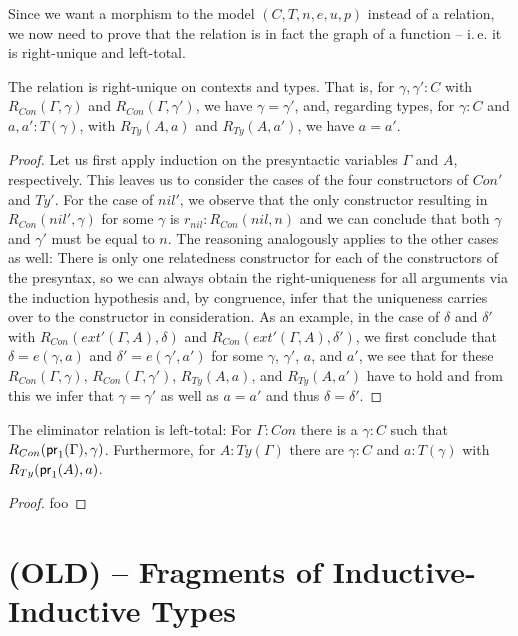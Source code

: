 Since we want a morphism to the model $(C, T, n, e, u, p)$ instead of a relation,
we now need to prove that the relation is in fact the graph of a function --
i.\,e. it is right-unique and left-total.

\begin{lemma}
The relation is right-unique on contexts and types. That is, for
$\gamma, \gamma' : C$ with $R_{Con}(\Gamma, \gamma)$ and $R_{Con}(\Gamma, \gamma')$,
we have $\gamma = \gamma'$, and, regarding types, for $\gamma : C$ and
$a, a' : T(\gamma)$, with $R_{Ty}(A, a)$ and $R_{Ty}(A, a')$,
we have $a = a'$.
\end{lemma}

\begin{proof}
Let us first apply induction on the presyntactic variables $\Gamma$ and $A$,
respectively.
This leaves us to consider the cases of the four constructors of $Con'$ and $Ty'$.
For the case of $nil'$, we observe that the only constructor resulting in
$R_{Con}(nil', \gamma)$ for some $\gamma$ is $r_{nil} : R_{Con}(nil, n)$ and we
can conclude that both $\gamma$ and $\gamma'$ must be equal to $n$.
The reasoning analogously applies to the other cases as well:
There is only one relatedness constructor for each of the constructors of the
presyntax, so we can always obtain the right-uniqueness for all arguments via
the induction hypothesis and, by congruence, infer that the uniqueness carries
over to the constructor in consideration.
As an example, in the case of $\delta$ and $\delta'$ with $R_{Con}(ext'(\Gamma, A), \delta)$
and $R_{Con}(ext'(\Gamma, A), \delta')$, we first conclude that
$\delta = e(\gamma, a)$ and $\delta' = e(\gamma', a')$ for some $\gamma$, $\gamma'$,
$a$, and $a'$, we see that for these $R_{Con}(\Gamma, \gamma)$, $R_{Con}(\Gamma, \gamma')$,
$R_{Ty}(A, a)$, and $R_{Ty}(A, a')$ have to hold and from this we infer
that $\gamma = \gamma'$ as well as $a = a'$ and thus $\delta = \delta'$.
\end{proof}

\begin{lemma}
The eliminator relation is left-total: For $\Gamma : Con$ there is a $\gamma : C$
such that $R_{Con}(\mathsf{pr}_1(\Gamma), \gamma)$.
Furthermore, for $A : Ty(\Gamma)$ there are $\gamma : C$ and $a : T(\gamma)$
with $R_{Ty}(\mathsf{pr}_1(A), a)$.
\end{lemma}

\begin{proof}
foo
\end{proof}

\section{(OLD) -- Fragments of Inductive-Inductive Types}

